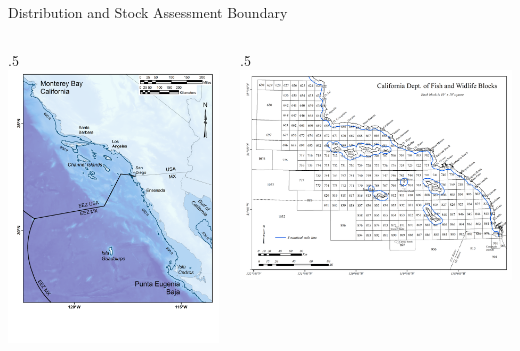 \documentclass[ignorenonframetext,]{beamer}
\def\begincols{\begin{columns}}
\def\begincol{\begin{column}}
\def\endcol{\end{column}}
\def\endcols{\end{columns}}
\begin{document}
\begin{frame}{Distribution and Stock Assessment Boundary}

\begincols
 \begincol{.5\textwidth} \includegraphics{Figures/Distribution_map.png}

\endcol
 \begincol{.5\textwidth} \includegraphics{Figures/assess_region_map.png}
\endcol
\endcols

\end{frame}
\end{document}
